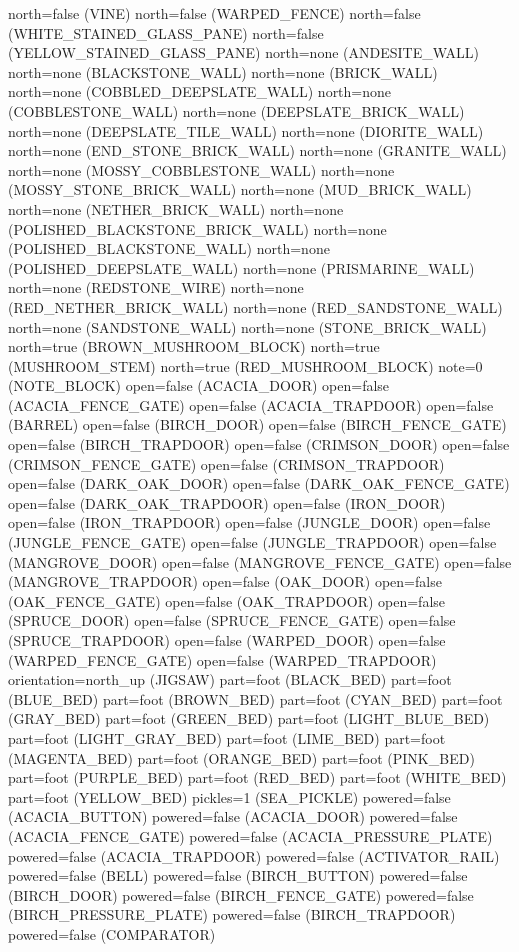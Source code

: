 \documentclass[11pt]{article}
\begin{document}
north=false (VINE)
north=false (WARPED_FENCE)
north=false (WHITE_STAINED_GLASS_PANE)
north=false (YELLOW_STAINED_GLASS_PANE)
north=none (ANDESITE_WALL)
north=none (BLACKSTONE_WALL)
north=none (BRICK_WALL)
north=none (COBBLED_DEEPSLATE_WALL)
north=none (COBBLESTONE_WALL)
north=none (DEEPSLATE_BRICK_WALL)
north=none (DEEPSLATE_TILE_WALL)
north=none (DIORITE_WALL)
north=none (END_STONE_BRICK_WALL)
north=none (GRANITE_WALL)
north=none (MOSSY_COBBLESTONE_WALL)
north=none (MOSSY_STONE_BRICK_WALL)
north=none (MUD_BRICK_WALL)
north=none (NETHER_BRICK_WALL)
north=none (POLISHED_BLACKSTONE_BRICK_WALL)
north=none (POLISHED_BLACKSTONE_WALL)
north=none (POLISHED_DEEPSLATE_WALL)
north=none (PRISMARINE_WALL)
north=none (REDSTONE_WIRE)
north=none (RED_NETHER_BRICK_WALL)
north=none (RED_SANDSTONE_WALL)
north=none (SANDSTONE_WALL)
north=none (STONE_BRICK_WALL)
north=true (BROWN_MUSHROOM_BLOCK)
north=true (MUSHROOM_STEM)
north=true (RED_MUSHROOM_BLOCK)
note=0 (NOTE_BLOCK)
open=false (ACACIA_DOOR)
open=false (ACACIA_FENCE_GATE)
open=false (ACACIA_TRAPDOOR)
open=false (BARREL)
open=false (BIRCH_DOOR)
open=false (BIRCH_FENCE_GATE)
open=false (BIRCH_TRAPDOOR)
open=false (CRIMSON_DOOR)
open=false (CRIMSON_FENCE_GATE)
open=false (CRIMSON_TRAPDOOR)
open=false (DARK_OAK_DOOR)
open=false (DARK_OAK_FENCE_GATE)
open=false (DARK_OAK_TRAPDOOR)
open=false (IRON_DOOR)
open=false (IRON_TRAPDOOR)
open=false (JUNGLE_DOOR)
open=false (JUNGLE_FENCE_GATE)
open=false (JUNGLE_TRAPDOOR)
open=false (MANGROVE_DOOR)
open=false (MANGROVE_FENCE_GATE)
open=false (MANGROVE_TRAPDOOR)
open=false (OAK_DOOR)
open=false (OAK_FENCE_GATE)
open=false (OAK_TRAPDOOR)
open=false (SPRUCE_DOOR)
open=false (SPRUCE_FENCE_GATE)
open=false (SPRUCE_TRAPDOOR)
open=false (WARPED_DOOR)
open=false (WARPED_FENCE_GATE)
open=false (WARPED_TRAPDOOR)
orientation=north_up (JIGSAW)
part=foot (BLACK_BED)
part=foot (BLUE_BED)
part=foot (BROWN_BED)
part=foot (CYAN_BED)
part=foot (GRAY_BED)
part=foot (GREEN_BED)
part=foot (LIGHT_BLUE_BED)
part=foot (LIGHT_GRAY_BED)
part=foot (LIME_BED)
part=foot (MAGENTA_BED)
part=foot (ORANGE_BED)
part=foot (PINK_BED)
part=foot (PURPLE_BED)
part=foot (RED_BED)
part=foot (WHITE_BED)
part=foot (YELLOW_BED)
pickles=1 (SEA_PICKLE)
powered=false (ACACIA_BUTTON)
powered=false (ACACIA_DOOR)
powered=false (ACACIA_FENCE_GATE)
powered=false (ACACIA_PRESSURE_PLATE)
powered=false (ACACIA_TRAPDOOR)
powered=false (ACTIVATOR_RAIL)
powered=false (BELL)
powered=false (BIRCH_BUTTON)
powered=false (BIRCH_DOOR)
powered=false (BIRCH_FENCE_GATE)
powered=false (BIRCH_PRESSURE_PLATE)
powered=false (BIRCH_TRAPDOOR)
powered=false (COMPARATOR)
\end{document}
